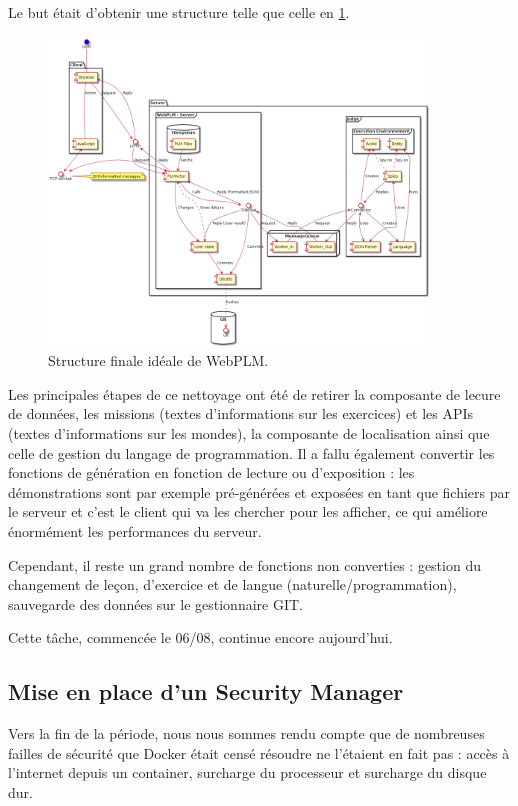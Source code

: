 \documentclass[stage]{tnreport}
\begin{document}
Le but était d'obtenir une structure telle que celle en \ref{fig:wplmUP4}.

\begin{figure}[h]
	\centering
		\includegraphics[width=0.9\textwidth]{figures/WebPLM-uml-cp4}
	\caption{Structure finale idéale de WebPLM.}
	\label{fig:wplmUP4}
\end{figure}

Les principales étapes de ce nettoyage ont été de retirer la composante de lecure de données, les missions (textes d'informations sur les exercices) et les APIs (textes d'informations sur les mondes), la composante de localisation ainsi que celle de gestion du langage de programmation. Il a fallu également convertir les fonctions de génération en fonction de lecture ou d'exposition : les démonstrations sont par exemple pré-générées et exposées en tant que fichiers par le serveur et c'est le client qui va les chercher pour les afficher, ce qui améliore énormément les performances du serveur.

Cependant, il reste un grand nombre de fonctions non converties : gestion du changement de leçon, d'exercice et de langue (naturelle/programmation), sauvegarde des données sur le gestionnaire GIT.

Cette tâche, commencée le 06/08, continue encore aujourd'hui.

\subsection{Mise en place d'un Security Manager}

Vers la fin de la période, nous nous sommes rendu compte que de nombreuses failles de sécurité que Docker était censé résoudre ne l'étaient en fait pas : accès à l'internet depuis un container, surcharge du processeur et surcharge du disque dur.
\end{document}

